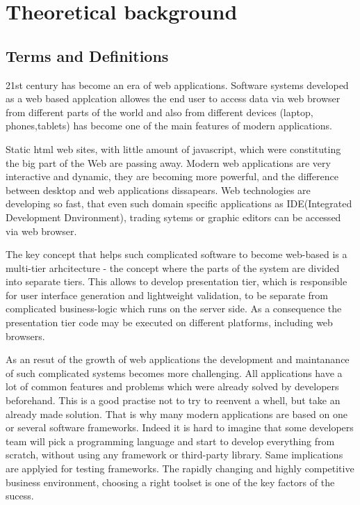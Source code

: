 \chapter{Theoretical background}
\label{ch:background} 
	\section{Terms and Definitions}
		21st century has become an era of web applications. Software systems developed
		as a web based applcation allowes the end user to access data via web browser
		from different parts of the world and also from different devices (laptop,
		phones,tablets) has become one of the main features of modern
		applications. 
		
		Static html web sites, with little amount of javascript, which were
		constituting the big part of the Web are passing away. Modern web
		applications are very interactive and dynamic, they are becoming
		more powerful, and the difference between desktop and web applications
		dissapears. Web technologies are developing so fast, that even such domain
		specific applications as IDE(Integrated Development Dnvironment), trading
		sytems or graphic editors can be accessed via web browser.
		
		 The key concept that helps such complicated software to become web-based is a
		 multi-tier arhcitecture - the concept where the parts of the system are divided into
		separate tiers. This allows to develop presentation tier, which is
		responsible for user interface generation and lightweight validation, to
		be separate from complicated business-logic which runs on the server
		side. As a consequence the presentation tier code may be executed on different
		platforms, including web browsers. 
		
		As an resut of the growth of web applications the development and maintanance
		of  such complicated systems becomes more challenging.	All
		applications have a lot of common features and problems which	were already solved by developers beforehand. This is a good practise not to
		try to reenvent a whell, but take an already made solution. That is why many
		modern applications are based on one or several software frameworks. Indeed it is hard to imagine that some developers team will pick a programming
		language and start to develop everything from scratch, without using any
		framework or third-party library. Same implications are applyied for testing
		frameworks. The rapidly changing and highly competitive business environment,
		choosing a right toolset is one of the key factors of the sucess. 
		
